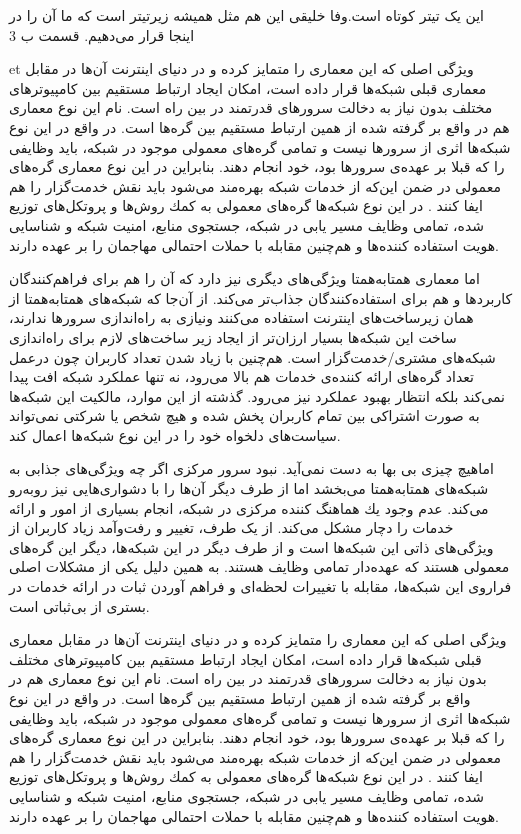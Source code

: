 \documentclass[12pt,twoside]{xepersian-magazine}
\begin{document}
\begin{article}{1}
	{این یک تیتر کوتاه است.وفا خلیقی}
	{این هم مثل همیشه زیرتیتر است که ما آن را در اینجا قرار می‌دهیم.}
	{قسمت ب}
	{3}




\noindent{}  et ويژگی اصلی که اين معماری را متمايز کرده و در دنيای اينترنت آن‌ها در مقابل معماری قبلی شبكه‌ها قرار داده است، امكان ايجاد ارتباط مستقيم  بين كامپيوترهای مختلف بدون نياز به دخالت سرورهای قدرتمند در بين راه است.  نام‌ اين نوع معماری هم در واقع بر گرفته شده از همین  ارتباط مستقیم بين گره‌ها است.  در واقع در اين نوع شبكه‌ها اثری از سرورها نيست و تمامی گره‌های معمولی موجود در شبكه، بايد وظايفی را که قبلا بر عهده‌ی سرورها بود، خود انجام دهند. بنابراين در اين نوع معماری گره‌های معمولی در ضمن اين‌که از خدمات شبکه بهره‌مند می‌شود بايد نقش خدمت‌گزار را هم ايفا کنند . در اين نوع شبکه‌ها گره‌های معمولی به كمك روش‌ها و پروتكل‌های توزيع شده، تمامی وظايف  مسير يابی در شبكه، جستجوی منابع، امنيت شبكه و شناسايی هويت استفاده كننده‌ها و هم‌چنين مقابله با حملات احتمالی مهاجمان را بر عهده دارند.

اما معماری همتابه‌همتا ويژگی‌های ديگری نيز دارد که آن را هم برای فراهم‌کنندگان کاربردها و هم برای استفاده‌کنندگان جذاب‌تر می‌کند.  از آن‌جا که شبکه‌های همتابه‌همتا از همان زيرساخت‌های اينترنت استفاده می‌کنند ونيازی به راه‌اندازی سرورها ندارند، ساخت اين شبكه‌ها بسيار ارزان‌تر از ايجاد زير ساخت‌های لازم برای راه‌اندازی شبكه‌های مشتری/خدمت‌گزار است.  هم‌چنين با زياد شدن تعداد کاربران چون درعمل تعداد گره‌های ارائه کننده‌ی خدمات هم بالا می‌رود، نه تنها عملكرد شبكه افت پيدا نمی‌كند بلكه انتظار بهبود عملکرد نيز می‌رود. گذشته از اين موارد، مالكيت اين شبكه‌ها به صورت اشتراكی بين تمام کاربران پخش شده و هيچ شخص يا شركتی نمی‌تواند سياست‌های دلخواه خود را در اين نوع شبكه‌ها اعمال کند.

اماهيچ چيزی بی‌ بها به دست نمی‌آید. نبود سرور مرکزی اگر چه  ويژگی‌های جذابی به شبکه‌های همتابه‌همتا می‌بخشد اما از طرف ديگر آن‌ها را با دشواری‌هايی نيز روبه‌رو می‌کند.  عدم وجود يك هماهنگ كننده مركزی در شبكه، انجام بسياری از امور و ارائه خدمات را  دچار مشكل می‌کند.  از يک طرف، تغيير و رفت‌وآمد زیاد کاربران از ويژگی‌های ذاتی اين شبکه‌ها است و از طرف ديگر در اين شبكه‌ها، ديگر اين گره‌های معمولی  هستند كه  عهده‌دار تمامی وظايف هستند. به همين دلیل يکی از مشکلات اصلی فراروی اين شبكه‌ها، مقابله با  تغييرات لحظه‌ای و فراهم آوردن ثبات در ارائه  خدمات در بستری از بی‌ثباتی است.  

ويژگی اصلی که اين معماری را متمايز کرده و در دنيای اينترنت آن‌ها در مقابل معماری قبلی شبكه‌ها قرار داده است، امكان ايجاد ارتباط مستقيم  بين كامپيوترهای مختلف بدون نياز به دخالت سرورهای قدرتمند در بين راه است.  نام‌ اين نوع معماری هم در واقع بر گرفته شده از همین  ارتباط مستقیم بين گره‌ها است.  در واقع در اين نوع شبكه‌ها اثری از سرورها نيست و تمامی گره‌های معمولی موجود در شبكه، بايد وظايفی را که قبلا بر عهده‌ی سرورها بود، خود انجام دهند. بنابراين در اين نوع معماری گره‌های معمولی در ضمن اين‌که از خدمات شبکه بهره‌مند می‌شود بايد نقش خدمت‌گزار را هم ايفا کنند . در اين نوع شبکه‌ها گره‌های معمولی به كمك روش‌ها و پروتكل‌های توزيع شده، تمامی وظايف  مسير يابی در شبكه، جستجوی منابع، امنيت شبكه و شناسايی هويت استفاده كننده‌ها و هم‌چنين مقابله با حملات احتمالی مهاجمان را بر عهده دارند.


\end{article}
\end{document}
